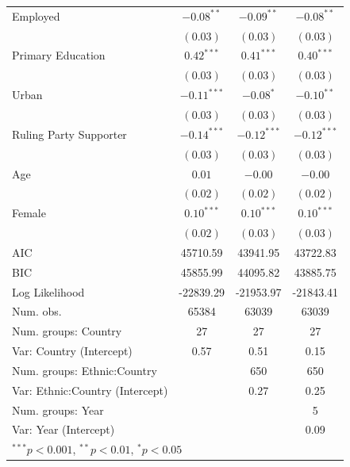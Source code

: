 \documentclass[12pt,]{book}
\let\origtable\table
\let\endorigtable\endtable
\renewenvironment{table}[1][2] {
    \singlespacing
    \expandafter\origtable\expandafter[H]
} {
    \endorigtable
}
\theoremstyle{definition}
\theoremstyle{definition}
\theoremstyle{definition}
\theoremstyle{remark}
\begin{document}
\begin{table}
\begin{center}
\begin{tabular}{l c c c }
Employed                                & $-0.08^{**}$  & $-0.09^{**}$  & $-0.08^{**}$  \\
                                        & $(0.03)$      & $(0.03)$      & $(0.03)$      \\
Primary Education                       & $0.42^{***}$  & $0.41^{***}$  & $0.40^{***}$  \\
                                        & $(0.03)$      & $(0.03)$      & $(0.03)$      \\
Urban                                   & $-0.11^{***}$ & $-0.08^{*}$   & $-0.10^{**}$  \\
                                        & $(0.03)$      & $(0.03)$      & $(0.03)$      \\
Ruling Party Supporter                  & $-0.14^{***}$ & $-0.12^{***}$ & $-0.12^{***}$ \\
                                        & $(0.03)$      & $(0.03)$      & $(0.03)$      \\
Age                                     & $0.01$        & $-0.00$       & $-0.00$       \\
                                        & $(0.02)$      & $(0.02)$      & $(0.02)$      \\
Female                                  & $0.10^{***}$  & $0.10^{***}$  & $0.10^{***}$  \\
                                        & $(0.02)$      & $(0.03)$      & $(0.03)$      \\
\hline
AIC                                     & 45710.59      & 43941.95      & 43722.83      \\
BIC                                     & 45855.99      & 44095.82      & 43885.75      \\
Log Likelihood                          & -22839.29     & -21953.97     & -21843.41     \\
Num. obs.                               & 65384         & 63039         & 63039         \\
Num. groups: Country                    & 27            & 27            & 27            \\
Var: Country (Intercept)                & 0.57          & 0.51          & 0.15          \\
Num. groups: Ethnic:Country             &               & 650           & 650           \\
Var: Ethnic:Country (Intercept)         &               & 0.27          & 0.25          \\
Num. groups: Year                       &               &               & 5             \\
Var: Year (Intercept)                   &               &               & 0.09          \\
\hline
\multicolumn{4}{l}{\scriptsize{$^{***}p<0.001$, $^{**}p<0.01$, $^*p<0.05$}}
\end{tabular}
\caption{Multilevel Models of Ethnic Identification}
\label{tab:ethnic}
\end{center}
\end{table}
\end{document}
